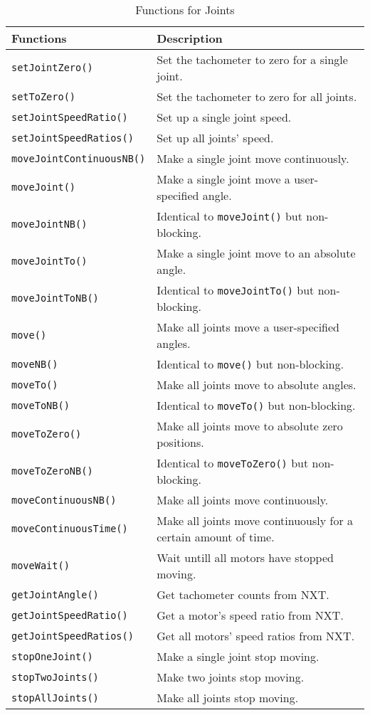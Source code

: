 \begin{longtable}{p{6cm}p{10cm}}
\caption{Functions for Joints}\\
\hline
Functions & Description\\
\hline
{\tt setJointZero()}         &Set the tachometer to zero for a single joint.\\
{\tt setToZero()}            &Set the tachometer to zero for all joints.\\
{\tt setJointSpeedRatio()}   &Set up a single joint speed.\\
{\tt setJointSpeedRatios()}  &Set up all joints' speed.\\
{\tt moveJointContinuousNB()}&Make a single joint move continuously.\\
{\tt moveJoint()}            &Make a single joint move a user-specified angle.\\
{\tt moveJointNB()}          &Identical to {\tt moveJoint()} but non-blocking.\\
{\tt moveJointTo()}          &Make a single joint move to an absolute angle.\\
{\tt moveJointToNB()}        &Identical to {\tt moveJointTo()} but non-blocking.\\
{\tt move()}                 &Make all joints move a user-specified angles.\\
{\tt moveNB()}               &Identical to {\tt move()} but non-blocking.\\
{\tt moveTo()}               &Make all joints move to absolute angles.\\
{\tt moveToNB()}             &Identical to {\tt moveTo()} but non-blocking.\\
{\tt moveToZero()}           &Make all joints move to absolute zero positions.\\
{\tt moveToZeroNB()}         &Identical to {\tt moveToZero()} but non-blocking.\\
{\tt moveContinuousNB()}     &Make all joints move continuously.\\
{\tt moveContinuousTime()}   &Make all joints move continuously for a certain amount of time.\\
{\tt moveWait()}             &Wait untill all motors have stopped moving.\\
{\tt getJointAngle()}        &Get tachometer counts from NXT.\\
{\tt getJointSpeedRatio()}   &Get a motor's speed ratio from NXT.\\
{\tt getJointSpeedRatios()}  &Get all motors' speed ratios from NXT.\\
{\tt stopOneJoint()}         &Make a single joint stop moving.\\
{\tt stopTwoJoints()}        &Make two joints stop moving.\\
{\tt stopAllJoints()}        &Make all joints stop moving.\\
\hline
\end{longtable}

